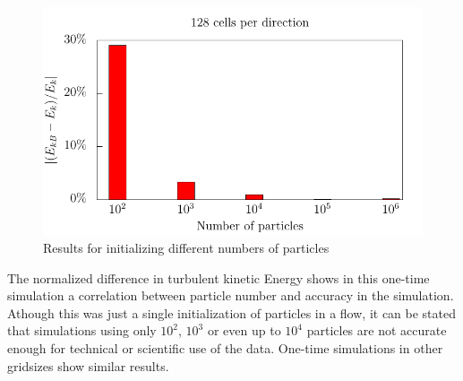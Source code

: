 \documentclass[11pt,a4paper,openany,oneside,parskip=half*]{article}
\begin{document}
\begin{figure}[h]
	\centering
  \includegraphics[width=\textwidth]{./../Simulationsergebnisse/variationPartikelAnzahl/128/kineticEnergy_numberOfParticles.pdf}
	\caption{Results for initializing different numbers of particles}
	\label{kineticEnergy_numberOfParticles}
\end{figure}
The normalized difference in turbulent kinetic Energy shows in this one-time simulation a correlation between particle number and accuracy in the simulation. Athough this was just a single initialization of particles in a flow, it can be stated that simulations using only $10^2$, $10^3$ or even up to $10^4$ particles are not accurate enough for technical or scientific use of the data. One-time simulations in other gridsizes show similar results.
\pagebreak
\end{document}
